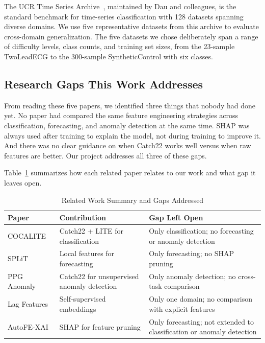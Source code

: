 \documentclass[10pt,conference]{IEEEtran}
\begin{document}
The UCR Time Series Archive~\cite{ucr}, maintained by Dau and colleagues, is the standard benchmark for time-series classification with 128 datasets spanning diverse domains. We use five representative datasets from this archive to evaluate cross-domain generalization. The five datasets we chose deliberately span a range of difficulty levels, class counts, and training set sizes, from the 23-sample TwoLeadECG to the 300-sample SyntheticControl with six classes.

\subsection{Research Gaps This Work Addresses}

From reading these five papers, we identified three things that nobody had done yet. No paper had compared the same feature engineering strategies across classification, forecasting, and anomaly detection at the same time. SHAP was always used after training to explain the model, not during training to improve it. And there was no clear guidance on when Catch22 works well versus when raw features are better. Our project addresses all three of these gaps.

Table~\ref{tab:related} summarizes how each related paper relates to our work and what gap it leaves open.

\begin{table}[H]
  \centering
  \caption{Related Work Summary and Gaps Addressed}
  \label{tab:related}
  \renewcommand{\arraystretch}{1.15}
  \begin{tabular}{p{1.5cm}p{2.3cm}p{2.8cm}}
    \toprule
    \textbf{Paper} & \textbf{Contribution} & \textbf{Gap Left Open} \\
    \midrule
    COCALITE~\cite{cocalite} & Catch22 + LITE for classification & Only classification; no forecasting or anomaly detection \\
    \midrule
    SPLiT~\cite{split} & Local features for forecasting & Only forecasting; no SHAP pruning \\
    \midrule
    PPG Anomaly~\cite{ppg_anom} & Catch22 for unsupervised anomaly detection & Only anomaly detection; no cross-task comparison \\
    \midrule
    Lag Features~\cite{lag_op} & Self-supervised embeddings & Only one domain; no comparison with explicit features \\
    \midrule
    AutoFE-XAI~\cite{autofe_xai} & SHAP for feature pruning & Only forecasting; not extended to classification or anomaly detection \\
    \bottomrule
  \end{tabular}
\end{table}
\end{document}
